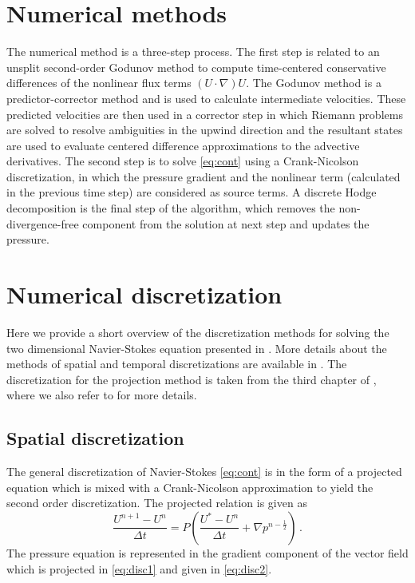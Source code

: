 \documentclass{article}
\begin{document}
\section{Numerical methods}

The numerical method is a three-step process. The first step is related to an unsplit second-order Godunov method to compute time-centered conservative differences of the nonlinear flux terms $(U \cdot \nabla)U$. The Godunov method is a predictor-corrector method and is used to calculate intermediate velocities. These predicted velocities are then used in a corrector step in which Riemann problems are solved to resolve ambiguities in the upwind direction and the resultant states are used to evaluate centered difference approximations to the advective derivatives. The second step is to solve \autoref{eq:cont} using a Crank-Nicolson discretization, in which the pressure gradient and the nonlinear term (calculated in the previous time step) are considered as source terms. A discrete Hodge decomposition is the final step of the algorithm, which removes the non-divergence-free component from the solution at next step and updates the pressure.

\section{Numerical discretization}

Here we provide a short overview of the discretization methods for solving the two dimensional Navier-Stokes equation presented in \cite{Bell1989a}. More details about the methods of spatial and temporal discretizations are available in \cite{Bell1991a}. The discretization for the projection method is taken from the third chapter of \cite{Lai1993a}, where we also refer to for more details.

\subsection{Spatial discretization}
The general discretization of Navier-Stokes \eqref{eq:cont} is in the form of a projected equation which is mixed with a Crank-Nicolson approximation to yield the second order discretization. The projected relation is given as
\begin{equation}
\label{eq:disc1}
\frac{U^{n+1} - U^n}{\Delta t} = P \left( \frac{U^* - U^n}{\Delta t} + \nabla p^{n-\frac{1}{2}} \right) \,.
 \end{equation}
The pressure equation is represented in the gradient component of the vector field which is projected in \eqref{eq:disc1} and given in \eqref{eq:disc2}.
\end{document}
